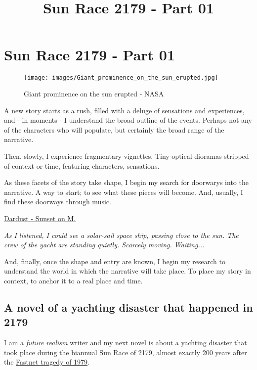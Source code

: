\documentclass[11pt]{article}
\title{Sun Race 2179 - Part 01}
\makeatletter
\def\maxwidth{\ifdim\Gin@nat@width>\linewidth\linewidth
    \else\Gin@nat@width\fi}
\let\Oldincludegraphics\includegraphics
\renewcommand{\includegraphics}[1]{\Oldincludegraphics[width=.8\maxwidth]{#1}}
\makeatother
\begin{document}
    
    
    \maketitle
    
    

    
    \section{Sun Race 2179 - Part 01}\label{sun-race-2179---part-01}

\begin{figure}[htbp]
\centering
\texttt{[image: images/Giant\_prominence\_on\_the\_sun\_erupted.jpg]}
\caption{Giant prominence on the sun erupted - NASA}
\end{figure}

A new story starts as a rush, filled with a deluge of sensations and
experiences, and - in moments - I understand the broad outline of the
events. Perhaps not any of the characters who will populate, but
certainly the broad range of the narrative.

Then, slowly, I experience fragmentary vignettes. Tiny optical dioramas
stripped of context or time, featuring characters, sensations.

As these facets of the story take shape, I begin my search for doorwarys
into the narrative. A way to start; to see what these pieces will
become. And, usually, I find these doorways through music.

\href{https://www.youtube.com/watch?v=wlkDFQxIbw4}{Dardust - Sunset on
M.}

\emph{As I listened, I could see a solar-sail space ship, passing close
to the sun. The crew of the yacht are standing quietly. Scarcely moving.
Waiting...}

And, finally, once the shape and entry are known, I begin my research to
understand the world in which the narrative will take place. To place my
story in context, to anchor it to a real place and time.

\subsection{A novel of a yachting disaster that happened in
2179}\label{a-novel-of-a-yachting-disaster-that-happened-in-2179}

I am a \emph{future realism} \href{https://gavinchait.com}{writer} and
my next novel is about a yachting disaster that took place during the
biannual Sun Race of 2179, almost exactly 200 years after the
\href{https://www.amazon.co.uk/Fastnet-Force-10-Deadliest-History-ebook/dp/B007HXKY86/}{Fastnet
tragedy of 1979}.
\end{document}
